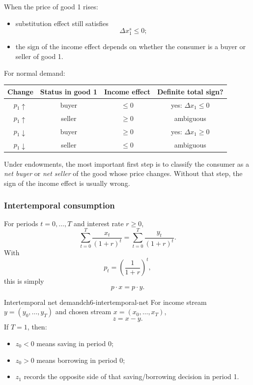 \begin{keyformula}[title={Key Formula: endowment price-change logic}]
When the price of good 1 rises:
\begin{itemize}
    \item substitution effect still satisfies
    \[
    \Delta x_1^s \le 0;
    \]
    \item the sign of the income effect depends on whether the consumer is a buyer or seller of good 1.
\end{itemize}
For normal demand:
\begin{center}
\renewcommand{\arraystretch}{1.2}
\begin{tabular}{|c|c|c|c|}
\hline
Change & Status in good 1 & Income effect & Definite total sign? \\
\hline
$p_1 \uparrow$ & buyer & $\le 0$ & yes: $\Delta x_1 \le 0$ \\
\hline
$p_1 \uparrow$ & seller & $\ge 0$ & ambiguous \\
\hline
$p_1 \downarrow$ & buyer & $\ge 0$ & yes: $\Delta x_1 \ge 0$ \\
\hline
$p_1 \downarrow$ & seller & $\le 0$ & ambiguous \\
\hline
\end{tabular}
\end{center}
\end{keyformula}

\begin{examtip}
Under endowments, the most important first step is to classify the consumer as a \emph{net buyer} or \emph{net seller} of the good whose price changes. Without that step, the sign of the income effect is usually wrong.
\end{examtip}

\subsubsection{Intertemporal consumption}

\begin{keyformula}[title={Key Formula: intertemporal budget}]
For periods $t=0,\dots,T$ and interest rate $r\ge 0$,
\[
\sum_{t=0}^{T} \frac{x_t}{(1+r)^t}
=
\sum_{t=0}^{T} \frac{y_t}{(1+r)^t}.
\]
With
\[
p_t=\left(\frac{1}{1+r}\right)^t,
\]
this is simply
\[
p\cdot x = p\cdot y.
\]
\end{keyformula}

\begin{definition}{Intertemporal net demand}{ch6-intertemporal-net}
For income stream $y=(y_0,\dots,y_T)$ and chosen stream $x=(x_0,\dots,x_T)$,
\[
z=x-y.
\]
If $T=1$, then:
\begin{itemize}
    \item $z_0<0$ means saving in period 0;
    \item $z_0>0$ means borrowing in period 0;
    \item $z_1$ records the opposite side of that saving/borrowing decision in period 1.
\end{itemize}
\end{definition}

